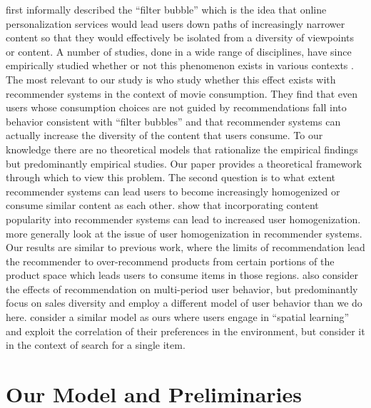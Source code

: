 \documentclass[format=acmsmall, review=false]{acmart}
\newcommand{\xhdr}[1]{\vspace{1mm} \noindent{\bf #1}}
\begin{document}
\xhdr{Related Work.} 
\cite{pariser2011filter} first informally described the ``filter bubble'' which is the idea that online personalization services would lead users down paths of increasingly narrower content so that they would effectively be isolated from a diversity of viewpoints or content. A number of studies, done in a wide range of disciplines, have since empirically studied whether or not this phenomenon exists in various contexts \cite{flaxman2016filter,hosanagar2013will,moller2018blame,nguyen2014exploring}. The most relevant to our study is \cite{nguyen2014exploring} who study whether this effect exists with recommender systems in the context of movie consumption. They find that even users whose consumption choices are not guided by recommendations fall into behavior consistent with ``filter bubbles'' and that recommender systems can actually increase the diversity of the content that users consume. To our knowledge there are no theoretical models that rationalize the empirical findings but predominantly empirical studies. Our paper provides a theoretical framework through which to view this problem.
The second question is to what extent recommender systems can lead users to become increasingly homogenized or consume similar content as each other. \cite{celma2008hits, treviranus2009value} show that incorporating content popularity into recommender systems can lead to increased user homogenization. \cite{chaney2018algorithmic} more generally look at the issue of user homogenization in recommender systems. Our results are similar to previous work, where the limits of recommendation lead the recommender to over-recommend products from certain portions of the product space which leads users to consume items in those regions.
\cite{fleder2009blockbuster} also consider the effects of recommendation on multi-period user behavior, but predominantly focus on sales diversity and employ a different model of user behavior than we do here. \cite{hodgson2019horse} consider a similar model as ours where users engage in ``spatial learning'' and exploit the correlation of their preferences in the environment, but consider it in the context of search for a single item.


\section{Our Model and Preliminaries}
\end{document}
